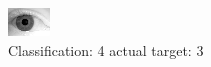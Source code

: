 \begin{figure}[h!]
\begin{center}
\includegraphics[width=0.60\columnwidth]{figures/ID2144_class_4_target_3.png}
\end{center}
\caption{ Classification: 4 actual target: 3}
\label{fig:ID2144_class_4_target_3}
\end{figure}
